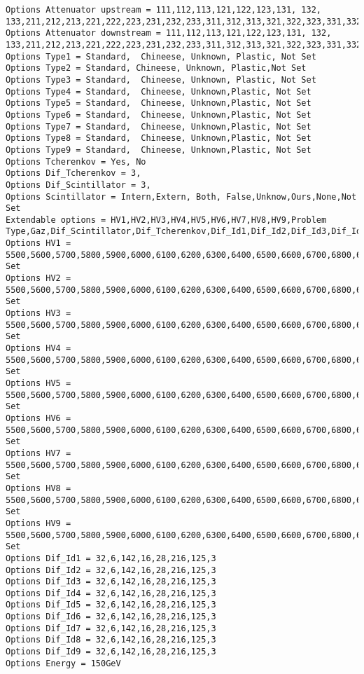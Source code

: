 {\begin{lstlisting}[breaklines=true,basicstyle=\tiny,postbreak=\mbox{\textcolor{red}{$\hookrightarrow$}\space},]
Options Attenuator upstream = 111,112,113,121,122,123,131, 132, 133,211,212,213,221,222,223,231,232,233,311,312,313,321,322,323,331,332,333
Options Attenuator downstream = 111,112,113,121,122,123,131, 132, 133,211,212,213,221,222,223,231,232,233,311,312,313,321,322,323,331,332,333
Options Type1 = Standard,  Chineese, Unknown, Plastic, Not Set
Options Type2 = Standard, Chineese, Unknown, Plastic,Not Set
Options Type3 = Standard,  Chineese, Unknown, Plastic, Not Set
Options Type4 = Standard,  Chineese, Unknown,Plastic, Not Set
Options Type5 = Standard,  Chineese, Unknown,Plastic, Not Set
Options Type6 = Standard,  Chineese, Unknown,Plastic, Not Set
Options Type7 = Standard,  Chineese, Unknown,Plastic, Not Set
Options Type8 = Standard,  Chineese, Unknown,Plastic, Not Set
Options Type9 = Standard,  Chineese, Unknown,Plastic, Not Set
Options Tcherenkov = Yes, No
Options Dif_Tcherenkov = 3,
Options Dif_Scintillator = 3,
Options Scintillator = Intern,Extern, Both, False,Unknow,Ours,None,Not Set
Extendable options = HV1,HV2,HV3,HV4,HV5,HV6,HV7,HV8,HV9,Problem Type,Gaz,Dif_Scintillator,Dif_Tcherenkov,Dif_Id1,Dif_Id2,Dif_Id3,Dif_Id4,Dif_Id5,Dif_Id6,Dif_Id7,Dif_Id8,Dif_Id9,Energy,Particles
Options HV1 = 5500,5600,5700,5800,5900,6000,6100,6200,6300,6400,6500,6600,6700,6800,6900,7000,7100,7200,Not Set
Options HV2 = 5500,5600,5700,5800,5900,6000,6100,6200,6300,6400,6500,6600,6700,6800,6900,7000,7100,7200,Not Set
Options HV3 = 5500,5600,5700,5800,5900,6000,6100,6200,6300,6400,6500,6600,6700,6800,6900,7000,7100,7200,Not Set
Options HV4 = 5500,5600,5700,5800,5900,6000,6100,6200,6300,6400,6500,6600,6700,6800,6900,7000,7100,7200,Not Set
Options HV5 = 5500,5600,5700,5800,5900,6000,6100,6200,6300,6400,6500,6600,6700,6800,6900,7000,7100,7200,Not Set
Options HV6 = 5500,5600,5700,5800,5900,6000,6100,6200,6300,6400,6500,6600,6700,6800,6900,7000,7100,7200,Not Set
Options HV7 = 5500,5600,5700,5800,5900,6000,6100,6200,6300,6400,6500,6600,6700,6800,6900,7000,7100,7200,Not Set
Options HV8 = 5500,5600,5700,5800,5900,6000,6100,6200,6300,6400,6500,6600,6700,6800,6900,7000,7100,7200,Not Set
Options HV9 = 5500,5600,5700,5800,5900,6000,6100,6200,6300,6400,6500,6600,6700,6800,6900,7000,7100,7200,Not Set
Options Dif_Id1 = 32,6,142,16,28,216,125,3
Options Dif_Id2 = 32,6,142,16,28,216,125,3
Options Dif_Id3 = 32,6,142,16,28,216,125,3
Options Dif_Id4 = 32,6,142,16,28,216,125,3
Options Dif_Id5 = 32,6,142,16,28,216,125,3
Options Dif_Id6 = 32,6,142,16,28,216,125,3
Options Dif_Id7 = 32,6,142,16,28,216,125,3
Options Dif_Id8 = 32,6,142,16,28,216,125,3
Options Dif_Id9 = 32,6,142,16,28,216,125,3
Options Energy = 150GeV


\end{lstlisting}}

